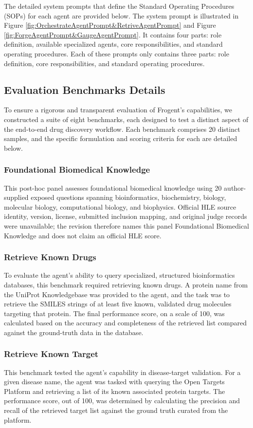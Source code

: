 \documentclass{article}
\newcommand{\nam}{Frogent}
\begin{document}
The detailed system prompts that define the Standard Operating Procedures (SOPs) for each agent are provided below. The system prompt is illustrated in Figure \ref{fig:OrchestrateAgentPrompt&RetriveAgentPrompt} and Figure \ref{fig:ForgeAgentPrompt&GaugeAgentPrompt}. It contains four parts: role definition, available specialized agents, core responsibilities, and standard operating procedures. Each of these prompts only contains three parts: role definition, core responsibilities, and standard operating procedures.

\subsection*{Evaluation Benchmarks Details}
To ensure a rigorous and transparent evaluation of \nam's capabilities, we constructed a suite of eight benchmarks, each designed to test a distinct aspect of the end-to-end drug discovery workflow. Each benchmark comprises 20 distinct samples, and the specific formulation and scoring criteria for each are detailed below.

\subsubsection*{Foundational Biomedical Knowledge}
This post-hoc panel assesses foundational biomedical knowledge using 20 author-supplied exposed questions spanning bioinformatics, biochemistry, biology, molecular biology, computational biology, and biophysics. Official HLE source identity, version, license, submitted inclusion mapping, and original judge records were unavailable; the revision therefore names this panel Foundational Biomedical Knowledge and does not claim an official HLE score.

\subsubsection*{Retrieve Known Drugs}
To evaluate the agent's ability to query specialized, structured bioinformatics databases, this benchmark required retrieving known drugs. A protein name from the UniProt Knowledgebase was provided to the agent, and the task was to retrieve the SMILES strings of at least five known, validated drug molecules targeting that protein. The final performance score, on a scale of 100, was calculated based on the accuracy and completeness of the retrieved list compared against the ground-truth data in the database.

\subsubsection*{Retrieve Known Target}
This benchmark tested the agent's capability in disease-target validation. For a given disease name, the agent was tasked with querying the Open Targets Platform and retrieving a list of its known associated protein targets. The performance score, out of 100, was determined by calculating the precision and recall of the retrieved target list against the ground truth curated from the platform.
\end{document}
